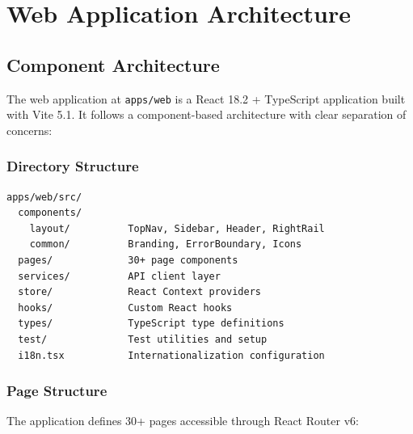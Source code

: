 \documentclass[11pt,a4paper]{article}
\begin{document}
\section{Web Application Architecture}

\subsection{Component Architecture}

The web application at \texttt{apps/web} is a React 18.2 + TypeScript application built with Vite 5.1. It follows a component-based architecture with clear separation of concerns:

\subsubsection{Directory Structure}

\begin{verbatim}
apps/web/src/
  components/
    layout/          TopNav, Sidebar, Header, RightRail
    common/          Branding, ErrorBoundary, Icons
  pages/             30+ page components
  services/          API client layer
  store/             React Context providers
  hooks/             Custom React hooks
  types/             TypeScript type definitions
  test/              Test utilities and setup
  i18n.tsx           Internationalization configuration
\end{verbatim}

\subsubsection{Page Structure}

The application defines 30+ pages accessible through React Router v6:
\end{document}
